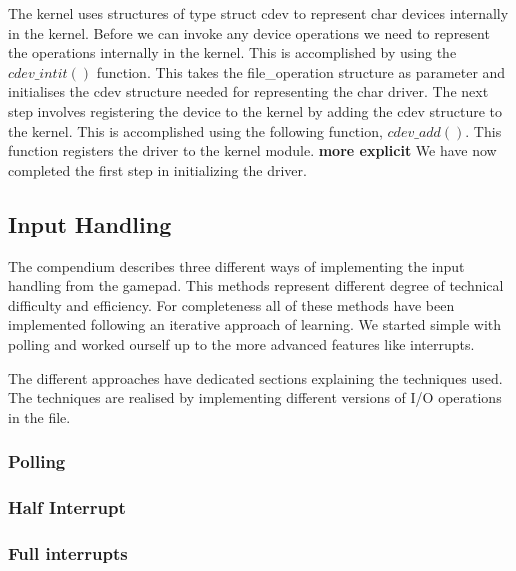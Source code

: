 The kernel uses structures of type struct cdev to represent char devices internally in the kernel. Before we can invoke any device operations we need to represent the operations internally in the kernel. This is accomplished by using the $cdev\_intit()$ function. This takes the file\_operation structure as parameter and initialises the cdev structure needed for representing the char driver. The next step involves registering the device to the kernel by adding the cdev structure to the kernel. This is accomplished using the following function, $cdev\_add()$. This function registers the driver to the kernel module. {\bf more explicit} We have now completed the first step in initializing the driver. 















  













\subsection{Input Handling}
The compendium describes three different ways of implementing the input handling from the gamepad. This methods represent different degree of technical difficulty and efficiency. For completeness all of these methods have been implemented following an iterative approach of learning. We started simple with polling and worked ourself up to the more advanced features like interrupts.  

The different approaches have dedicated sections explaining the techniques used. The techniques are realised by implementing different versions of I/O operations in the file.  

\subsubsection{Polling}


\subsubsection{Half Interrupt}


\subsubsection{Full interrupts}

